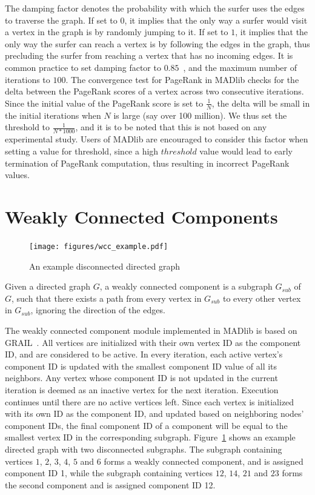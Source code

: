 The damping factor denotes the probability with which the surfer uses the edges
to traverse the graph. If set to $0$, it implies that the only way a surfer
would visit a vertex in the graph is by randomly jumping to it. If set to
$1$, it implies that the only way the surfer can reach a vertex is by following
the edges in the graph, thus precluding the surfer from reaching a vertex
that has no incoming edges. It is common practice to set damping factor
to $0.85$~\cite{pagerank}, and the maximum number of iterations to $100$.
The convergence test for PageRank in MADlib checks for the delta between
the PageRank scores of a vertex across two consecutive iterations. Since
the initial value of the PageRank score is set to $\frac{1}{N}$, the delta
will be small in the initial iterations when $N$ is large (say over 100
million). We thus set the threshold to $\frac{1}{N*1000}$, and it is to be
noted that this is not based on any experimental study. Users of MADlib are
encouraged to consider this factor when setting a value for threshold, since
a high $threshold$ value would lead to early termination of PageRank
computation, thus resulting in incorrect PageRank values.


\section{Weakly Connected Components} \label{sec:graph:wcc}
\begin{figure}[h]
    \centering
    \texttt{[image: figures/wcc\_example.pdf]}
\caption{An example disconnected directed graph}
\label{wcc:example}
\end{figure}

Given a directed graph $G$, a weakly connected component is a subgraph
$G_{sub}$ of $G$, such that there exists a path from every vertex in $G_{sub}$
to every other vertex in $G_{sub}$, ignoring the direction of the edges.

The weakly connected component module implemented in MADlib is based on
GRAIL~\cite{grail}. All vertices are initialized with their own vertex
ID as the component ID, and are considered to be active. In every iteration,
each active vertex's component ID is updated with the smallest component ID
value of all its neighbors. Any vertex whose component ID is not updated in
the current iteration is deemed as an inactive vertex for the next iteration.
Execution continues until there are no active vertices left. Since each vertex
is initialized with its own ID as the component ID, and updated based on
neighboring nodes' component IDs, the final component ID of a component will
be equal to the smallest vertex ID in the corresponding subgraph.
Figure~\ref{wcc:example} shows an example directed graph with two disconnected
subgraphs. The subgraph containing vertices $1$, $2$, $3$, $4$, $5$ and $6$
forms a weakly connected component, and is assigned component ID 1, while the
subgraph containing vertices $12$, $14$, $21$ and $23$ forms the second component
and is assigned component ID 12.

